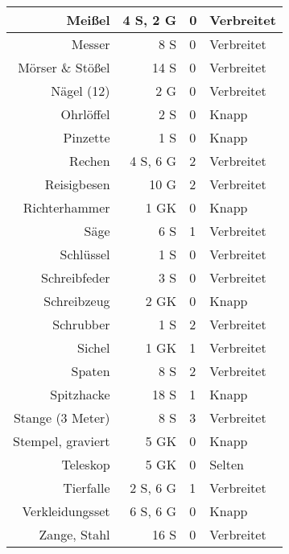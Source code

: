 \documentclass[a4paper, 9pt]{scrartcl}
\begin{document}
\begin{table}[]
\begin{minipage}{.5\linewidth}
\begin{tabularx}{0.95\linewidth}{RRll}
            Meißel              & 4 S, 2 G       & 0           & Verbreitet          \\ \hline
            Messer              & 8 S            & 0           & Verbreitet          \\ \hline
            Mörser \& Stößel    & 14 S           & 0           & Verbreitet          \\ \hline
            Nägel (12)          & 2 G            & 0           & Verbreitet          \\ \hline
            Ohrlöffel           & 2 S            & 0           & Knapp               \\ \hline
            Pinzette            & 1 S            & 0           & Knapp               \\ \hline
            Rechen              & 4 S, 6 G       & 2           & Verbreitet          \\ \hline
            Reisigbesen         & 10 G           & 2           & Verbreitet          \\ \hline
            Richterhammer       & 1 GK           & 0           & Knapp               \\ \hline
            Säge                & 6 S            & 1           & Verbreitet          \\ \hline
            Schlüssel           & 1 S            & 0           & Verbreitet          \\ \hline
            Schreibfeder        & 3 S            & 0           & Verbreitet          \\ \hline
            Schreibzeug         & 2 GK           & 0           & Knapp               \\ \hline
            Schrubber           & 1 S            & 2           & Verbreitet          \\ \hline
            Sichel              & 1 GK           & 1           & Verbreitet          \\ \hline
            Spaten              & 8 S            & 2           & Verbreitet          \\ \hline
            Spitzhacke          & 18 S           & 1           & Knapp               \\ \hline
            Stange (3 Meter)    & 8 S            & 3           & Verbreitet          \\ \hline
            Stempel, graviert   & 5 GK           & 0           & Knapp               \\ \hline
            Teleskop            & 5 GK           & 0           & Selten              \\ \hline
            Tierfalle           & 2 S, 6 G       & 1           & Verbreitet          \\ \hline
            Verkleidungsset     & 6 S, 6 G       & 0           & Knapp               \\ \hline
            Zange, Stahl        & 16 S           & 0           & Verbreitet
        \end{tabularx}%


\end{minipage}
\end{table}
\end{document}
